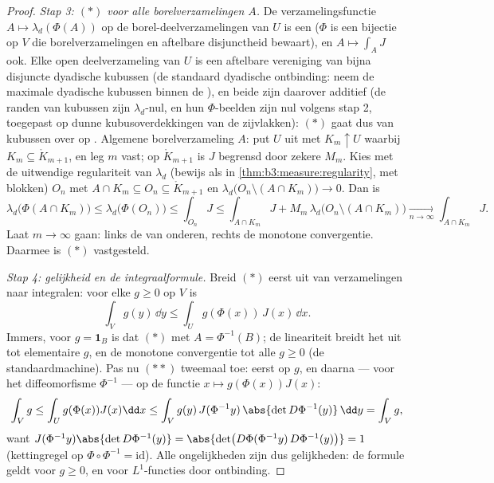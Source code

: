 \begin{proof}
\emph{Stap 3: $(*)$ voor alle borelverzamelingen $A$.} De
verzamelingsfunctie $A \mapsto \lambda_d(\Phi(A))$ op de
borel-deelverzamelingen van $U$ is een  ($\Phi$ is een
bijectie op $V$ die borelverzamelingen en aftelbare disjunctheid
bewaart), en $A \mapsto \int_AJ$ ook. Elke open deelverzameling
van $U$ is een aftelbare vereniging van bijna disjuncte dyadische
 kubussen (de standaard dyadische ontbinding: neem de
maximale dyadische kubussen binnen de ), en beide
 zijn daarover additief (de randen van kubussen zijn
$\lambda_d$-nul, en hun $\Phi$-beelden zijn nul volgens stap 2,
toegepast op dunne kubusoverdekkingen van de zijvlakken): $(*)$
gaat dus van kubussen over op . Algemene
borelverzameling $A$: put $U$ uit met  $K_m \uparrow U$
waarbij $K_m \subseteq \mathring K_{m+1}$, en leg $m$ vast; op
$\mathring K_{m+1}$ is $J$ begrensd door zekere $M_m$. Kies met de
uitwendige regulariteit van $\lambda_d$ (bewijs als in
\cref{thm:b3:measure:regularity}, met blokken) 
$O_n$ met $A \cap K_m \subseteq O_n \subseteq \mathring K_{m+1}$
en $\lambda_d\bigl(O_n \setminus (A\cap K_m)\bigr) \to 0$. Dan is
\[
\lambda_d\bigl(\Phi(A\cap K_m)\bigr) \leq
\lambda_d\bigl(\Phi(O_n)\bigr) \leq \int_{O_n}J
\leq \int_{A\cap K_m}J + M_m\,\lambda_d\bigl(O_n\setminus(A\cap
K_m)\bigr) \xrightarrow[n\to\infty]{} \int_{A\cap K_m}J .
\]
Laat $m \to \infty$ gaan: links de  van onderen,
rechts de monotone convergentie. Daarmee is $(*)$ vastgesteld.

\emph{Stap 4: gelijkheid en de integraalformule.} Breid $(*)$
eerst uit van verzamelingen naar integralen: voor elke  $g
\geq 0$ op $V$ is
\[
\int_V g(y)\,\dd y \leq \int_U g(\Phi(x))\,J(x)\,\dd x .
\tag{$**$}
\]
Immers, voor $g = \mathbf 1_B$ is dat $(*)$ met $A =
\Phi^{-1}(B)$; de lineariteit breidt het uit tot elementaire $g$,
en de monotone convergentie tot alle $g \geq 0$ (de
standaardmachine). Pas nu $(**)$ tweemaal toe: eerst op $g$, en
daarna --- voor het diffeomorfisme $\Phi^{-1}$ --- op de functie
$x \mapsto g(\Phi(x))J(x)$:
\[
\int_Vg \leq \int_U g(\Phi(x))J(x)\dd x
\leq \int_V g(y)\,J(\Phi^{-1}y)\,\abs{\det
D\Phi^{-1}(y)}\,\dd y = \int_V g ,
\]
want $J(\Phi^{-1}y)\abs{\det D\Phi^{-1}(y)} = \abs{\det\bigl(
D\Phi(\Phi^{-1}y)\,D\Phi^{-1}(y)\bigr)} = 1$ (kettingregel op
$\Phi\circ\Phi^{-1} = \mathrm{id}$). Alle ongelijkheden zijn dus
gelijkheden: de formule geldt voor $g \geq 0$, en voor
$L^1$-functies door ontbinding.
\end{proof}

